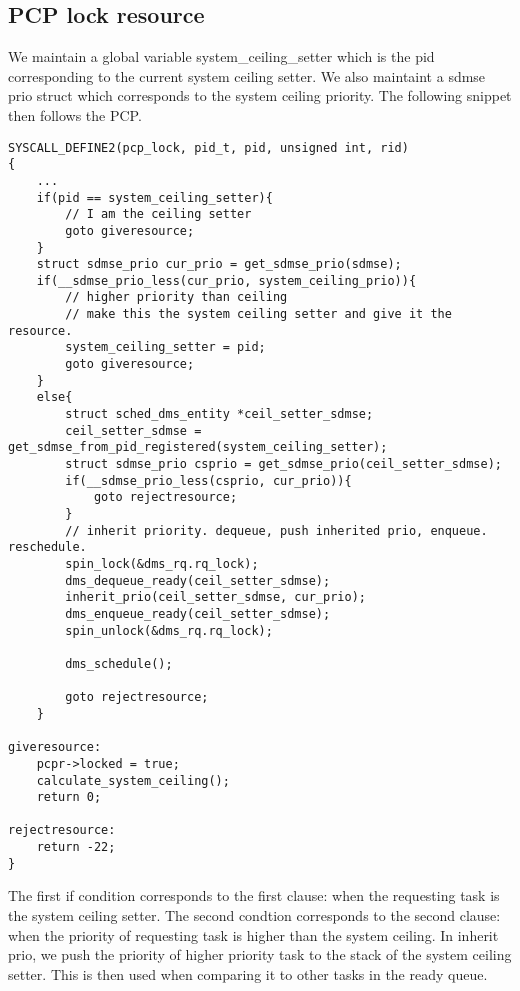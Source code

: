 \documentclass[12pt, letterpaper]{article}
\begin{document}
\subsection{PCP lock resource}
We maintain a global variable system\_ceiling\_setter which is the pid corresponding to the current system ceiling setter. We also maintaint a sdmse prio struct which corresponds to the system ceiling 
priority. The following snippet then follows the PCP.
\begin{lstlisting}
SYSCALL_DEFINE2(pcp_lock, pid_t, pid, unsigned int, rid)
{
    ...
    if(pid == system_ceiling_setter){
        // I am the ceiling setter
        goto giveresource;
    }
    struct sdmse_prio cur_prio = get_sdmse_prio(sdmse);
    if(__sdmse_prio_less(cur_prio, system_ceiling_prio)){
        // higher priority than ceiling
        // make this the system ceiling setter and give it the resource.
        system_ceiling_setter = pid;
        goto giveresource;
    }
    else{
        struct sched_dms_entity *ceil_setter_sdmse;
        ceil_setter_sdmse = get_sdmse_from_pid_registered(system_ceiling_setter);
        struct sdmse_prio csprio = get_sdmse_prio(ceil_setter_sdmse);
        if(__sdmse_prio_less(csprio, cur_prio)){
            goto rejectresource;
        }
        // inherit priority. dequeue, push inherited prio, enqueue. reschedule.
        spin_lock(&dms_rq.rq_lock);
        dms_dequeue_ready(ceil_setter_sdmse);
        inherit_prio(ceil_setter_sdmse, cur_prio);
        dms_enqueue_ready(ceil_setter_sdmse);
        spin_unlock(&dms_rq.rq_lock);

        dms_schedule();

        goto rejectresource;
    }

giveresource:
    pcpr->locked = true;
    calculate_system_ceiling();
    return 0;

rejectresource:
    return -22;
}
\end{lstlisting}
The first if condition corresponds to the first clause: when the requesting task is the system ceiling setter. The second condtion corresponds to the second clause: when the priority of requesting task is 
higher than the system ceiling. In inherit prio, we push the priority of higher priority task to the stack of the system ceiling setter. This is then used when comparing it to other tasks in the ready queue. 
\end{document}
